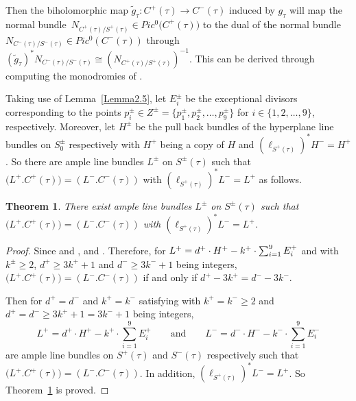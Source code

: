 \documentclass[10pt,a4paper]{amsart}
\numberwithin{equation}{section}
\newtheorem{Theorem}{Theorem}[section]
\def\operatorname#1{#1}
\begin{document}
Then the biholomorphic map $\widetilde{g}_{\tau}\colon C^{+}(\tau)\rightarrow C^{-}(\tau)$ induced by $g_{\tau}$ will map the normal bundle~${N_{C^+(\tau)/S^+(\tau)}\in \operatorname{Pic}^{0}\bigl(C^{+}(\tau)\bigr)}$ to the dual of the normal bundle $N_{C^-(\tau)/S^-(\tau)}\in \operatorname{Pic}^{0}(C^{-}(\tau))$ through $(\widetilde{g}_{\tau})^*N_{C^-(\tau)/S^-(\tau)}\cong (N_{C^+(\tau)/S^+(\tau)})^{-1}$. This can be derived through computing the monodromies of .

Taking use of Lemma~\ref{Lemma2.5}, let $E^{\pm}_i$ be the exceptional divisors corresponding to the points $p^{\pm}_i \in Z^{\pm}=\bigl\{p^{\pm}_1, p^{\pm}_2, \dots , p^{\pm}_9\bigr\}$ for $i \in \{1, 2, \dots , 9 \}$, respectively. Moreover, let $H^{\pm}$ be the pull back bundles of the hyperplane line bundles on $S_0^{\pm}$ respectively with $H^+$ being a copy of $H$ and $(\ell_{S^{+}(\tau)})^*H^-=H^+$. So there are ample line bundles $L^{\pm}$ on $S^{\pm}(\tau)$ such that $\bigl(L^{+}.C^{+}(\tau)\bigr)=(L^{-}.C^{-}(\tau))$ with $(\ell_{S^{+}(\tau)})^*L^{-}=L^{+}$ as follows.

\begin{Theorem} \label{Theorem2.6}
There exist ample line bundles $L^{\pm}$ on $S^{\pm}(\tau)$ such that $\bigl(L^{+}.C^{+}(\tau)\bigr)\!=\!(L^{-}.C^{-}(\tau))$ with $(\ell_{S^{+}(\tau)})^*L^{-}=L^{+}$.
\end{Theorem}

\begin{proof}
Since  and ,  and . Therefore, for $L^{+}=d^{+}\cdot H^{+}-k^{+} \cdot \smash{\sum _{i=1}^9 E_i^{+}}$ and  with $k^{\pm}\geq2$, $d^{+} \geq 3k^{+}+1 $ and $d^{-} \geq 3k^{-}+1 $ being integers, $\bigl(L^{+}.C^{+}(\tau)\bigr)=(L^{-}.C^{-}(\tau))$ if and only if $d^{+}-3k^{+}=d^{-}-3k^{-}$.

Then for $d^{+}=d^{-}$ and $k^{+}=k^{-}$ satisfying  with $k^{+}=k^{-}\geq 2$ and $d^{+}=d^{-}\geq 3k^{+}+1=3k^{-}+1$ being integers,
\[
L^{+}=d^{+}\cdot H^{+}-k^{+}\cdot\sum _{i=1}^9 E_i^{+}\qquad \text{and}\qquad L^{-}=d^{-}\cdot H^{-}-k^{-}\cdot\sum _{i=1}^9 E_i^{-}\]
 are ample line bundles on $S^{+}(\tau)$ and $S^{-}(\tau)$ respectively such that $\bigl(L^{+}.C^{+}(\tau)\bigr)=(L^{-}.C^{-}(\tau))$. In addition, $(\ell_{S^{+}(\tau)})^*L^{-}=L^{+}$. So Theorem~\ref{Theorem2.6} is proved.
\end{proof}
\end{document}
